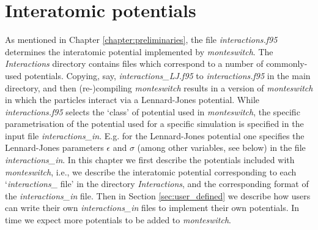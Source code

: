 \documentclass{report}
\begin{document}
\chapter{Interatomic potentials}\label{chapter:interactions}
As mentioned in Chapter \ref{chapter:preliminaries}, the file \emph{interactions.f95} determines the interatomic potential implemented by
\emph{monteswitch}. The \emph{Interactions} directory contains files which correspond to a number of commonly-used potentials. Copying, say,
\emph{interactions\_LJ.f95} to \emph{interactions.f95} in the main directory, and then (re-)compiling \emph{monteswitch} results in a version 
of \emph{monteswitch} in which the particles interact via a Lennard-Jones potential. While \emph{interactions.f95} selects the `class' of potential
used in \emph{monteswitch}, the specific parametrisation of the potential used for a specific simulation is specified in the input file
\emph{interactions\_in}. E.g. for the Lennard-Jones potential one specifies the Lennard-Jones parameters $\epsilon$ and $\sigma$ (among other
variables, see below) in the file \emph{interactions\_in}. In this chapter we first describe the potentials included with \emph{monteswitch},
i.e., we describe the interatomic potential corresponding to each `\emph{interactions\_} file' in the directory \emph{Interactions}, and the
corresponding format of the \emph{interactions\_in} file. Then in Section \ref{sec:user_defined} we describe how users can write their own
\emph{interactions\_in} files to implement their own potentials. In time we expect more potentials to be added to \emph{monteswitch}.
\end{document}
